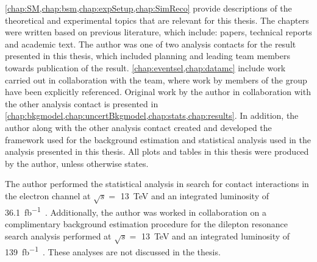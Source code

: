\cref{chap:SM,chap:bsm,chap:expSetup,chap:SimReco} provide descriptions of the theoretical and experimental topics that are relevant for this thesis. The chapters were written based on previous literature, which include: papers, technical reports and academic text. The author was one of two analysis contacts for the result presented in this thesis, which included planning and leading team members towards publication of the result. \cref{chap:eventsel,chap:datamc} include work carried out in collaboration with the team, where work by members of the group have been explicitly referenced. Original work by the author in collaboration with the other analysis contact is presented in \cref{chap:bkgmodel,chap:uncertBkgmodel,chap:stats,chap:results}. In addition, the author along with the other analysis contact created and developed the framework used for the background estimation and statistical analysis used in the analysis presented in this thesis. All plots and tables in this thesis were produced by the author, unless otherwise states. 

The author performed the statistical analysis in search for contact interactions in the electron channel at $\sqrt{s} = $ \SI{13}{\tera\electronvolt} and an integrated luminosity of \SI{36.1}{\femto\barn^{-1}}~\cite{EXOT-2016-05}. Additionally, the author was worked in collaboration on a complimentary background estimation procedure for the dilepton resonance search analysis performed  at $\sqrt{s} = $ \SI{13}{\tera\electronvolt} and an integrated luminosity of \SI{139}{\femto\barn^{-1}}~\cite{Aad:2019fac}. These analyses are not discussed in the thesis. 
